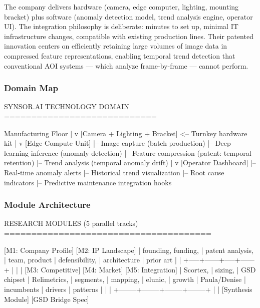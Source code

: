 \documentclass[11pt,letterpaper]{article}
\begin{document}
The company delivers hardware (camera, edge computer, lighting, mounting bracket) plus software (anomaly detection model, trend analysis engine, operator UI). The integration philosophy is deliberate: minutes to set up, minimal IT infrastructure changes, compatible with existing production lines. Their patented innovation centers on efficiently retaining large volumes of image data in compressed feature representations, enabling temporal trend detection that conventional AOI systems --- which analyze frame-by-frame --- cannot perform.

\subsubsection{Domain Map}

\begin{asciibox}
SYNSOR.AI TECHNOLOGY DOMAIN
============================

Manufacturing Floor
  |
  v
[Camera + Lighting + Bracket]  <-- Turnkey hardware kit
  |
  v
[Edge Compute Unit]
  |-- Image capture (batch production)
  |-- Deep learning inference (anomaly detection)
  |-- Feature compression (patent: temporal retention)
  |-- Trend analysis (temporal anomaly drift)
  |
  v
[Operator Dashboard]
  |-- Real-time anomaly alerts
  |-- Historical trend visualization
  |-- Root cause indicators
  |-- Predictive maintenance integration hooks
\end{asciibox}

\subsubsection{Module Architecture}

\begin{asciibox}
RESEARCH MODULES (5 parallel tracks)
======================================

[M1: Company Profile]     [M2: IP Landscape]
  |  founding, funding,     |  patent analysis,
  |  team, product           |  defensibility,
  |  architecture            |  prior art
  |                          |
  +-----+------+-----+------+
        |      |      |
[M3: Competitive]  [M4: Market]     [M5: Integration]
  |  Scortex,       |  sizing,        |  GSD chipset
  |  Relimetrics,   |  segments,      |  mapping,
  |  elunic,        |  growth         |  Paula/Denise
  |  incumbents     |  drivers        |  patterns
  |                 |                  |
  +--------+--------+--------+--------+
           |                 |
    [Synthesis Module]  [GSD Bridge Spec]
\end{asciibox}
\end{document}
